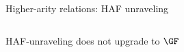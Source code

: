 \documentclass[aspectratio=169]{beamer}
\begin{document}
\begin{frame}{Higher-arity relations: HAF unraveling}
  
  

  \begin{columns}
    \begin{column}{0.2\textwidth}
      \begin{overprint}


      \end{overprint}
    \end{column}
    \begin{column}{0.75\textwidth}
      \begin{overprint}
        \exunravelstruct{}


        \exunravelhat{}
      \end{overprint}
    \end{column}
  \end{columns}
\end{frame}

\begin{frame}{HAF-unraveling does not upgrade to $\GF$}
  
\end{frame}

%     

%     
\end{document}
